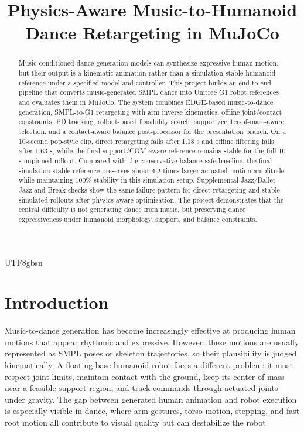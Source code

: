 \documentclass[conference]{IEEEtran}
\begin{document}
\begin{CJK*}{UTF8}{gbsn}

\title{Physics-Aware Music-to-Humanoid Dance Retargeting in MuJoCo}

\author{
}

\maketitle

\begin{abstract}
Music-conditioned dance generation models can synthesize expressive human motion, but their output is a kinematic animation rather than a simulation-stable humanoid reference under a specified model and controller. This project builds an end-to-end pipeline that converts music-generated SMPL dance into Unitree G1 robot references and evaluates them in MuJoCo. The system combines EDGE-based music-to-dance generation, SMPL-to-G1 retargeting with arm inverse kinematics, offline joint/contact constraints, PD tracking, rollout-based feasibility search, support/center-of-mass-aware selection, and a contact-aware balance post-processor for the presentation branch. On a 10-second pop-style clip, direct retargeting falls after 1.18 s and offline filtering falls after 1.63 s, while the final support/COM-aware reference remains stable for the full 10 s unpinned rollout. Compared with the conservative balance-safe baseline, the final simulation-stable reference preserves about 4.2 times larger actuated motion amplitude while maintaining 100\% stability in this simulation setup. Supplemental Jazz/Ballet-Jazz and Break checks show the same failure pattern for direct retargeting and stable simulated rollouts after physics-aware optimization. The project demonstrates that the central difficulty is not generating dance from music, but preserving dance expressiveness under humanoid morphology, support, and balance constraints.
\end{abstract}

\IEEEpeerreviewmaketitle

\section{Introduction}
Music-to-dance generation has become increasingly effective at producing human motions that appear rhythmic and expressive. However, these motions are usually represented as SMPL poses or skeleton trajectories, so their plausibility is judged kinematically. A floating-base humanoid robot faces a different problem: it must respect joint limits, maintain contact with the ground, keep its center of mass near a feasible support region, and track commands through actuated joints under gravity. The gap between generated human animation and robot execution is especially visible in dance, where arm gestures, torso motion, stepping, and fast root motion all contribute to visual quality but can destabilize the robot.


\end{CJK*}
\end{document}
